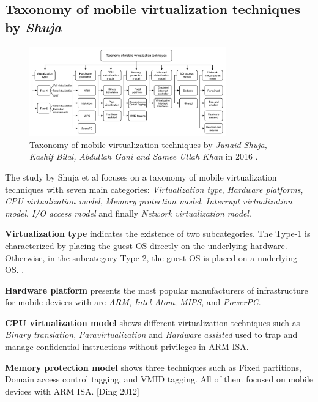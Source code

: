	\subsection{Taxonomy of mobile virtualization techniques by \textit{Shuja}}
	
	\begin{figure}[H]
		\centering
		\includegraphics[width=8.5cm]{images/Shuja2016.pdf}
		\vspace{-0.2cm}
		\caption{Taxonomy of mobile virtualization techniques by \textit{Junaid Shuja, Kashif Bilal, Abdullah Gani and Samee Ullah Khan} in 2016 \cite{Shuja2016}.}
		\label{fig:TaxonomyByShuja}
	\end{figure}

	The study by Shuja et al \cite{Shuja2016} focuses on a taxonomy of mobile virtualization techniques with seven main categories: \textit{Virtualization type}, \textit{Hardware platforms}, \textit{CPU virtualization model}, \textit{Memory protection model}, \textit{Interrupt virtualization model}, \textit{I/O access model} and finally \textit{Network virtualization model}. 
	
	\textbf{Virtualization type} indicates the existence of two subcategories. The Type-1 is characterized by placing the guest OS directly on the underlying hardware. Otherwise, in the subcategory Type-2, the guest OS is placed on a underlying OS. \cite{Shuja2016, Zonghua2012}.
	
	\textbf{Hardware platform} presents the most popular manufacturers of infrastructure for mobile devices with are \textit{ARM}, \textit{Intel Atom}, \textit{MIPS}, and \textit{PowerPC}.
	
	\textbf{CPU virtualization model} shows different virtualization techniques such as \textit{Binary translation}, \textit{Paravirtualization} and \textit{Hardware assisted} used to trap and manage confidential instructions without privileges in ARM ISA. 
	
	\textbf{Memory protection model} shows three techniques such as Fixed partitions, Domain access control tagging, and VMID tagging. All of them focused on mobile devices with ARM ISA. [Ding 2012]

